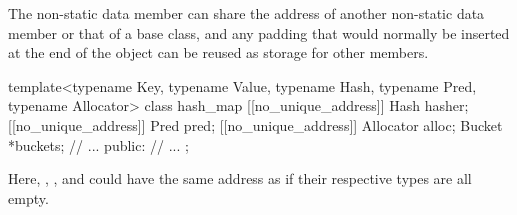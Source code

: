 \pnum
\begin{note}
The non-static data member can share the address of
another non-static data member or that of a base class,
and any padding that would normally be inserted
at the end of the object
can be reused as storage for other members.
\end{note}
\begin{example}
\begin{codeblock}
template<typename Key, typename Value,
         typename Hash, typename Pred, typename Allocator>
class hash_map {
  [[no_unique_address]] Hash hasher;
  [[no_unique_address]] Pred pred;
  [[no_unique_address]] Allocator alloc;
  Bucket *buckets;
  // ...
public:
  // ...
};
\end{codeblock}
Here, , , and 
could have the same address as 
if their respective types are all empty.
\end{example}
